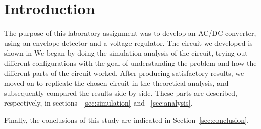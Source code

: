 \section{Introduction}
\label{sec:introduction}

The purpose of this laboratory assignment was to develop an AC/DC converter, using an envelope detector and a voltage regulator. The circuit we developed is shown in
We began by doing the simulation analysis of the circuit, trying out different configurations with the goal of understanding the problem and how the different
parts of the circuit worked. After producing satisfactory results, we moved on to replicate the chosen circuit in the theoretical analysis, and subsequently compared the results side-by-side.
These parts are described, respectively, in sections ~\ref{sec:simulation} and ~\ref{sec:analysis}.

Finally, the conclusions of this study are indicated in
Section~\ref{sec:conclusion}.

